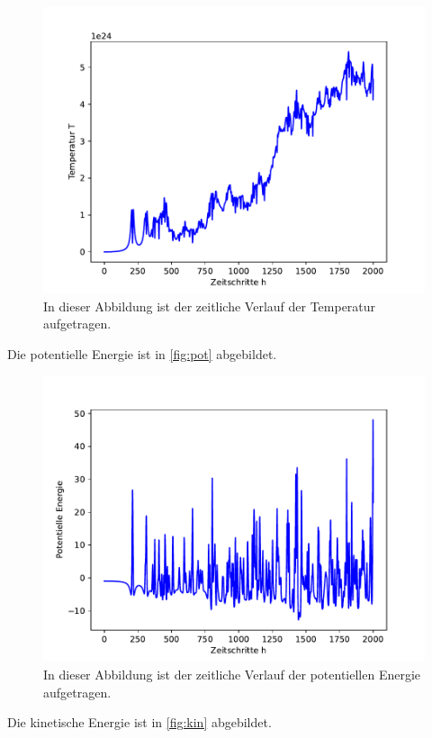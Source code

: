 \begin{figure}[H]
    \centering
    \includegraphics[scale=0.5]{MolDyn/Small Boy/temperature.pdf}
    \caption{In dieser Abbildung ist der zeitliche Verlauf der Temperatur aufgetragen.}
    \label{fig:temp}
\end{figure}
\newpage
Die potentielle Energie ist in \autoref{fig:pot} abgebildet.
\begin{figure}[H]
    \centering
    \includegraphics[scale=0.5]{MolDyn/Small Boy/potential_energy.pdf}
    \caption{In dieser Abbildung ist der zeitliche Verlauf der potentiellen Energie aufgetragen.}
    \label{fig:pot}
\end{figure}
Die kinetische Energie ist in \autoref{fig:kin} abgebildet.
